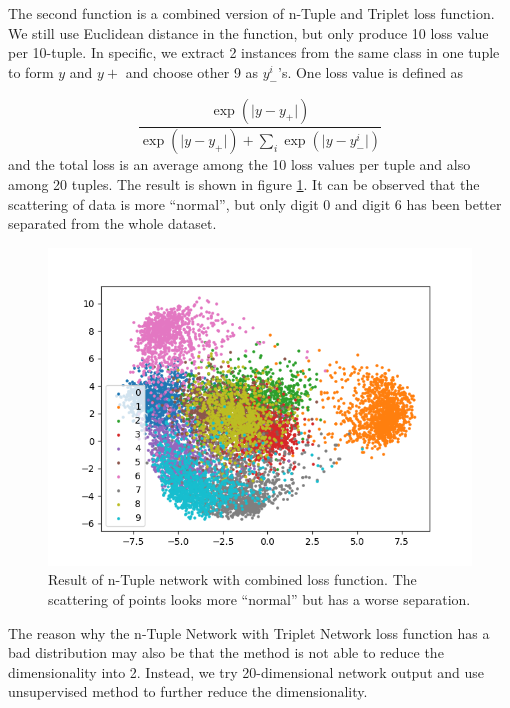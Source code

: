 \documentclass[10pt,twocolumn,letterpaper]{article}
\begin{document}
			The second function is a combined version of n-Tuple and Triplet loss function. We still use Euclidean distance in the function, but only produce 10 loss value per 10-tuple. In specific, we extract 2 instances from the same class in one tuple to form $y$ and $y+$ and choose other 9 as $y_-^i$'s. One loss value is defined as
			
			\begin{equation}
				\frac{\exp{(\lvert y-y_+ \rvert)}}{\exp{(\lvert y-y_+ \rvert)} + \sum_i\exp{(\lvert y-y_-^i \rvert)}}
			\end{equation}
			and the total loss is an average among the 10 loss values per tuple and also among 20 tuples. The result is shown in figure \ref{fig:second_tuple}. It can be observed that the scattering of data is more ``normal'', but only digit 0 and digit 6 has been better separated from the whole dataset.
			
			\begin{figure}[htbp]
				\begin{center}
					\includegraphics[width=0.9\linewidth]{second_tuple}
				\end{center}
				\caption{Result of n-Tuple network with combined loss function. The scattering of points looks more ``normal'' but has a worse separation.\label{fig:second_tuple}}
			\end{figure}
			
			The reason why the n-Tuple Network with Triplet Network loss function has a bad distribution may also be that the method is not able to reduce the dimensionality into 2. Instead, we try 20-dimensional network output and use unsupervised method to further reduce the dimensionality.
\end{document}
